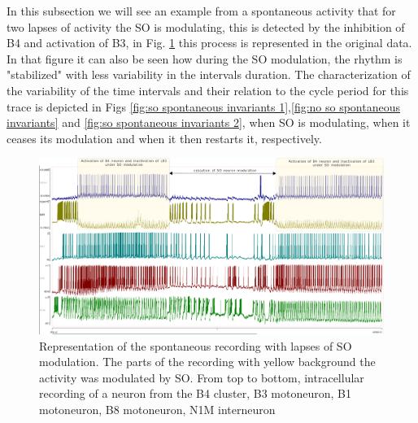 In this subsection we will see an example from a spontaneous activity that for two lapses of activity the SO is modulating, this is detected by the inhibition of B4 and activation of B3, in Fig. \ref{fig:SO-spontaneous-driven} this process is represented in the original data. In that figure it can also be seen how during the SO modulation, the rhythm is "stabilized" with less variability in the intervals duration. The characterization of the variability of the time intervals and their relation to the cycle period for this trace is depicted in Figs \ref{fig:so spontaneous invariants 1},\ref{fig:no so spontaneous invariants} and \ref{fig:so spontaneous invariants 2}, when SO is modulating, when it ceases its modulation and when it then restarts it, respectively. 


 \begin{figure}[htbp]
 	\centering
 	\includegraphics[width=\textwidth]{./img/invariants/SO-spontaneuous-driven.pdf}
 	\caption{Representation of the spontaneous recording with lapses of SO modulation. The parts of the recording with yellow background the activity was modulated by SO. From top to bottom, intracellular recording of a neuron from the B4 cluster, B3 motoneuron, B1 motoneuron, B8 motoneuron, N1M interneuron}
 	\label{fig:SO-spontaneous-driven}
 \end{figure}

